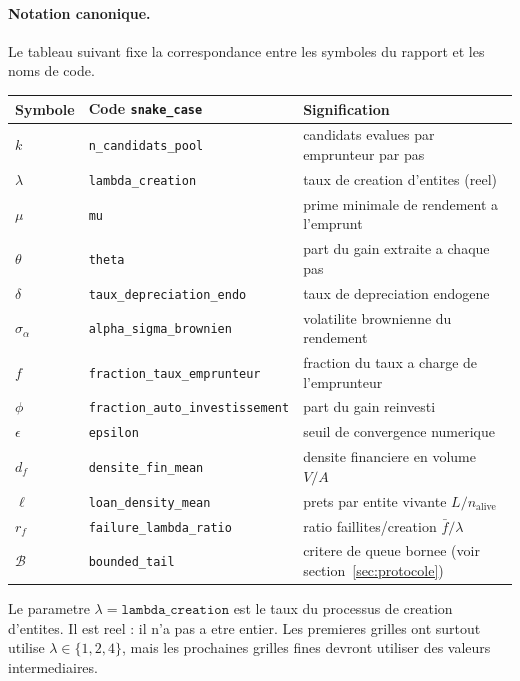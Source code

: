 \documentclass[11pt,a4paper]{article}
\begin{document}
\paragraph{Notation canonique.}
Le tableau suivant fixe la correspondance entre les symboles du rapport et
les noms de code.

\begin{center}
\small
\begin{tabular}{lll}
\toprule
Symbole & Code \texttt{snake\_case} & Signification \\
\midrule
\(k\) & \texttt{n\_candidats\_pool} & candidats evalues par emprunteur par pas \\
\(\lambda\) & \texttt{lambda\_creation} & taux de creation d'entites (reel) \\
\(\mu\) & \texttt{mu} & prime minimale de rendement a l'emprunt \\
\(\theta\) & \texttt{theta} & part du gain extraite a chaque pas \\
\(\delta\) & \texttt{taux\_depreciation\_endo} & taux de depreciation endogene \\
\(\sigma_\alpha\) & \texttt{alpha\_sigma\_brownien} & volatilite brownienne du rendement \\
\(f\) & \texttt{fraction\_taux\_emprunteur} & fraction du taux a charge de l'emprunteur \\
\(\phi\) & \texttt{fraction\_auto\_investissement} & part du gain reinvesti \\
\(\epsilon\) & \texttt{epsilon} & seuil de convergence numerique \\
\(d_f\) & \texttt{densite\_fin\_mean} & densite financiere en volume \(V/A\) \\
\(\ell\) & \texttt{loan\_density\_mean} & prets par entite vivante \(L/n_{\mathrm{alive}}\) \\
\(r_f\) & \texttt{failure\_lambda\_ratio} & ratio faillites/creation \(\bar{f}/\lambda\) \\
\(\mathcal{B}\) & \texttt{bounded\_tail} & critere de queue bornee (voir section~\ref{sec:protocole}) \\
\bottomrule
\end{tabular}
\end{center}

Le parametre \(\lambda=\texttt{lambda\_creation}\) est le taux du processus de
creation d'entites. Il est reel : il n'a pas a etre entier. Les premieres
grilles ont surtout utilise \(\lambda\in\{1,2,4\}\), mais les prochaines grilles
fines devront utiliser des valeurs intermediaires.
\end{document}
